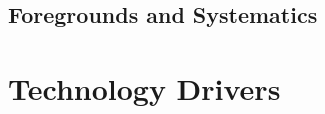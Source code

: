 \documentclass[12pt]{article}
\begin{document}
%


\vspace{-0.06in}

\subsection{Foregrounds and Systematics}%
\label{sec:signal_separation}



\vspace{-0.06in}



\vspace{-0.06in}

\section{Technology Drivers}
\label{sec:techdrivers}

\vspace{-0.06in}



\vspace{-0.06in}



\vspace{-0.06in}



\newpage
\def\bibfont{\footnotesize}
\setlength{\bibsep}{1pt}




\end{document}
